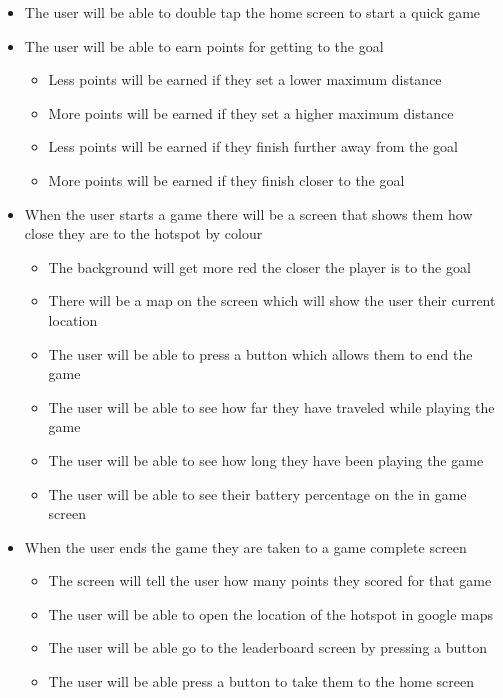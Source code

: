 \documentclass[10pt, a4paper]{article}
\begin{document}
\begin{itemize}
\item The user will be able to double tap the home screen to start a quick game

\item The user will be able to earn points for getting to the goal
	\begin{itemize}
		\item Less points will be earned if they set a lower maximum distance
        \item More points will be earned if they  set a higher maximum distance
        \item Less points will be earned if they finish further away from the goal
        \item More points will be earned if they finish closer to the goal
	\end{itemize}

\item When the user starts a game there will be a screen that shows them how close they are to the hotspot by colour
	\begin{itemize}
		\item The background will get more red the closer the player is to the goal
        \item There will be a map on the screen which will show the user their current location
        \item The user will be able to press a button which allows them to end the game
        \item The user will be able to see how far they have traveled while playing the game
        \item The user will be able to see how long they have been playing the game
        \item The user will be able to see their battery percentage on the in game screen
	\end{itemize}


\item When the user ends the game they are taken to a game complete screen
	\begin{itemize}
		\item The screen will tell the user how many points they scored for that game
        \item The user will be able to open the location of the hotspot in google maps
        \item The user will be able go to the leaderboard screen by pressing a button
        \item The user will be able press a button to take them to the home screen
	\end{itemize}


\end{itemize}
\end{document}
